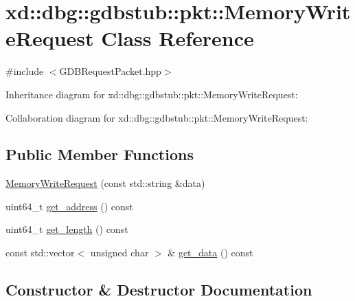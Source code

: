 \hypertarget{classxd_1_1dbg_1_1gdbstub_1_1pkt_1_1_memory_write_request}{}\section{xd\+:\+:dbg\+:\+:gdbstub\+:\+:pkt\+:\+:Memory\+Write\+Request Class Reference}
\label{classxd_1_1dbg_1_1gdbstub_1_1pkt_1_1_memory_write_request}


{\ttfamily \#include $<$G\+D\+B\+Request\+Packet.\+hpp$>$}



Inheritance diagram for xd\+:\+:dbg\+:\+:gdbstub\+:\+:pkt\+:\+:Memory\+Write\+Request\+:


Collaboration diagram for xd\+:\+:dbg\+:\+:gdbstub\+:\+:pkt\+:\+:Memory\+Write\+Request\+:
\subsection*{Public Member Functions}
\begin{DoxyCompactItemize}
\item 
\mbox{\hyperlink{classxd_1_1dbg_1_1gdbstub_1_1pkt_1_1_memory_write_request_aebfc356952fbb7bef656e300326391bc}{Memory\+Write\+Request}} (const std\+::string \&data)
\item 
uint64\+\_\+t \mbox{\hyperlink{classxd_1_1dbg_1_1gdbstub_1_1pkt_1_1_memory_write_request_ac5e550c6b6e1fb374bc18f66c616fbf1}{get\+\_\+address}} () const
\item 
uint64\+\_\+t \mbox{\hyperlink{classxd_1_1dbg_1_1gdbstub_1_1pkt_1_1_memory_write_request_a3e84e4c5ff530aa9f869ec388e08445e}{get\+\_\+length}} () const
\item 
const std\+::vector$<$ unsigned char $>$ \& \mbox{\hyperlink{classxd_1_1dbg_1_1gdbstub_1_1pkt_1_1_memory_write_request_a8f7f017929795410c3d2ac3c378d9677}{get\+\_\+data}} () const
\end{DoxyCompactItemize}


\subsection{Constructor \& Destructor Documentation}
\mbox{\label{classxd_1_1dbg_1_1gdbstub_1_1pkt_1_1_memory_write_request_aebfc356952fbb7bef656e300326391bc}} 
